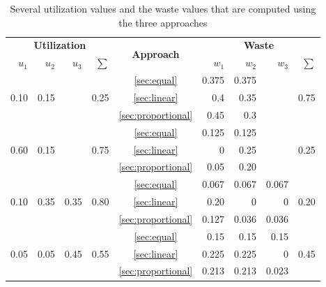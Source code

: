 \begin{table}
    \centering
    \begin{tabular}{|r|r|r|r|c|r|r|r|r|}
        \hline
        \multicolumn{4}{|c|}{\textbf{Utilization}} & \multirow{2}{*}{\textbf{Approach}} & \multicolumn{4}{|c|}{\textbf{Waste}} \\ 
        $u_1$ & $u_2$ & $u_3$ & $\sum$ & \multirow{2}{*}{} & $w_1$ & $w_2$ & $w_3$ & $\sum$ \\ \hline
        
\multirow{3}{*}{0.10} & \multirow{3}{*}{0.15} &  & \multirow{3}{*}{0.25} 
& \ref{sec:equal} & 0.375 & 0.375 & &                            \multirow{3}{*}{0.75} \\
\multirow{3}{*}{}     & \multirow{3}{*}{}     & & \multirow{3}{*}{}
& \ref{sec:linear} & 0.4 & 0.35 & & \multirow{3}{*}{} \\
\multirow{3}{*}{}     & \multirow{3}{*}{}     & & \multirow{3}{*}{}
& \ref{sec:proportional} & 0.45 & 0.3 & & \multirow{3}{*}{} \\ \hline
        
\multirow{3}{*}{0.60} & \multirow{3}{*}{0.15} &  & \multirow{3}{*}{0.75} 
& \ref{sec:equal} & 0.125 & 0.125 & &                            \multirow{3}{*}{0.25} \\
\multirow{3}{*}{}     & \multirow{3}{*}{}     & & \multirow{3}{*}{}
& \ref{sec:linear} & 0 & 0.25 & & \multirow{3}{*}{} \\
\multirow{3}{*}{}     & \multirow{3}{*}{}     & & \multirow{3}{*}{}
& \ref{sec:proportional} & 0.05 & 0.20 & & \multirow{3}{*}{} \\ \hline

\multirow{3}{*}{0.10} & \multirow{3}{*}{0.35} & \multirow{3}{*}{0.35} & \multirow{3}{*}{0.80} 
& \ref{sec:equal} & 0.067 & 0.067 & 0.067 & \multirow{3}{*}{0.20} \\
\multirow{3}{*}{}     & \multirow{3}{*}{}     & \multirow{3}{*}{} & \multirow{3}{*}{}
& \ref{sec:linear} & 0.20 & 0 & 0 & \multirow{3}{*}{} \\
\multirow{3}{*}{}     & \multirow{3}{*}{}     & \multirow{3}{*}{} & \multirow{3}{*}{}
& \ref{sec:proportional} & 0.127 & 0.036 & 0.036 & \multirow{3}{*}{} \\ \hline

\multirow{3}{*}{0.05} & \multirow{3}{*}{0.05} & \multirow{3}{*}{0.45} & \multirow{3}{*}{0.55} 
& \ref{sec:equal} & 0.15 & 0.15 & 0.15 & \multirow{3}{*}{0.45} \\
\multirow{3}{*}{}     & \multirow{3}{*}{}     & \multirow{3}{*}{} & \multirow{3}{*}{}
& \ref{sec:linear} & 0.225 & 0.225 & 0 & \multirow{3}{*}{} \\
\multirow{3}{*}{}     & \multirow{3}{*}{}     & \multirow{3}{*}{} & \multirow{3}{*}{}
& \ref{sec:proportional} & 0.213 & 0.213 & 0.023 & \multirow{3}{*}{} \\ \hline
      
    \end{tabular}
    \caption{Several utilization values and the waste values that are computed using the three approaches}
    \label{tab:values}
\end{table}


